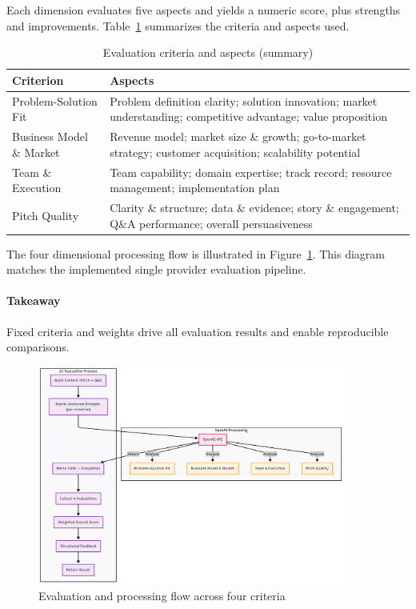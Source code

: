 Each dimension evaluates five aspects and yields a numeric score, plus strengths and improvements. Table~\ref{tab:criteria} summarizes the criteria and aspects used.

\begin{table}[H]
  \centering
  \caption{Evaluation criteria and aspects (summary)}
  \label{tab:criteria}
  \begin{tabular}{p{4cm} p{9cm}}
    \toprule
    \textbf{Criterion} & \textbf{Aspects} \\
    \midrule
    Problem\mbox{-}Solution Fit & Problem definition clarity; solution innovation; market understanding; competitive advantage; value proposition \\
    Business Model \& Market & Revenue model; market size \& growth; go-to-market strategy; customer acquisition; scalability potential \\
    Team \& Execution & Team capability; domain expertise; track record; resource management; implementation plan \\
    Pitch Quality & Clarity \& structure; data \& evidence; story \& engagement; Q\&A performance; overall persuasiveness \\
    \bottomrule
  \end{tabular}
\end{table}

The four dimensional processing flow is illustrated in Figure~\ref{fig:eval-flow}. This diagram matches the implemented single provider evaluation pipeline.

\paragraph{Takeaway} Fixed criteria and weights drive all evaluation results and enable reproducible comparisons.

\begin{figure}[H]
  \centering
  \includegraphics[width=0.9\textwidth]{img/eval-flow}
\caption{Evaluation and processing flow across four criteria}
  \label{fig:eval-flow}
\end{figure}

